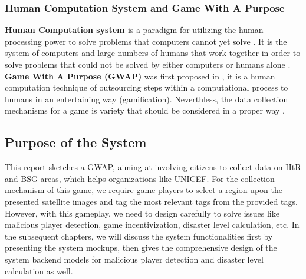 \subsubsection{Human Computation System and Game With A Purpose}


\textbf{Human Computation system \label{idx:hc}} is a paradigm for utilizing the human processing power to solve problems 
that computers cannot yet solve \cite{quinn2011human}.
It is the system of computers and large numbers of humans that work together in order to solve problems 
that could not be solved by either computers or humans alone \cite{quinn2009taxonomy}.
\textbf{Game With A Purpose (GWAP)\label{idx:gwap}} was first proposed in \cite{von2005esp, von2006games}, it
is a human computation technique of outsourcing steps 
within a computational process to humans in an entertaining way (gamification). 
Neverthless, the data collection mechanisms for a game is variety that should be considered in a proper way \cite{von2008designing}.

\subsection{Purpose of the System}

This report sketches a GWAP, aiming at involving citizens to collect data on HtR and BSG \cite{unicef2017report} areas, 
which helps organizations like UNICEF. For the collection mechanism of this game, 
we require game players to select a region upon
the presented satellite images and tag the most relevant tags from the provided tags.
However, with this gameplay, we need to design carefully to solve issues like malicious player detection,
game incentivization, disaster level calculation, etc.
In the subsequent chapters, we will discuss the system functionalities first by presenting the system mockups, 
then gives the comprehensive design of the system backend models for malicious player detection
and disaster level calculation as well. 

